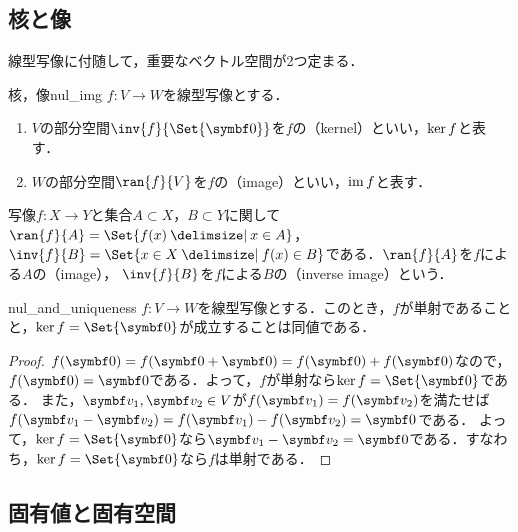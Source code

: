 \documentclass[../../main]{subfiles}
\begin{document}
\subsection{核と像}

線型写像に付随して，重要なベクトル空間が2つ定まる．

\begin{definition}{核，像}{nul_img}
  \(f\colon V\to W\)を線型写像とする．
  \begin{enumerate}
    \item \(V\)の部分空間\(\inv{f}{\Set{\vect{0}}}\)を\(f\)の（kernel）といい，\(\operatorname{ker} f\)と表す．
    \item \(W\)の部分空間\(\ran{f}{V}\)を\(f\)の（image）といい，\(\operatorname{im} f\)と表す．
  \end{enumerate}
\end{definition}

\begin{note}
  写像\(f\colon X\to Y\)と集合\(A\subset X\)，\(B\subset Y\)に関して\(\ran{f}{A}=\Set{f(x)\given x\in A}\)，
  \(\inv{f}{B}=\Set{x\in X\given f(x)\in B}\)である．\(\ran{f}{A}\)を\(f\)による\(A\)の（image），
  \(\inv{f}{B}\)を\(f\)による\(B\)の（inverse image）という．
\end{note}

\begin{proposition}{}{nul_and_uniqueness}
  \(f\colon V\to W\)を線型写像とする．このとき，\(f\)が単射であることと，\(\nul f=\Set{\zvec}\)が成立することは同値である．
\end{proposition}

\begin{proof}
  \(f(\zvec)=f(\zvec+\zvec)=f(\zvec)+f(\zvec)\)なので，\(f(\zvec)=\zvec\)である．よって，\(f\)が単射なら\(\nul f=\Set{\zvec}\)である．
  また，\(\vect{v}_1,\vect{v}_2\in V\)が\(f(\vect{v}_1)=f(\vect{v}_2)\)を満たせば\(f(\vect{v}_1-\vect{v}_2)=f(\vect{v}_1)-f(\vect{v}_2)=\zvec\)である．
  よって，\(\nul f=\Set{\zvec}\)なら\(\vect{v}_1-\vect{v}_2=\zvec\)である．すなわち，\(\nul f=\Set{\zvec}\)なら\(f\)は単射である．
\end{proof}

\subsection{固有値と固有空間}
\end{document}
